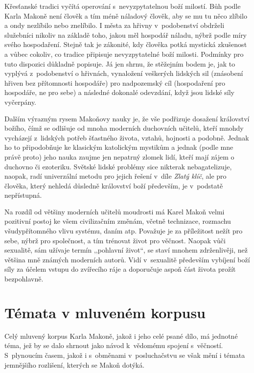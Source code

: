 Křesťanské tradici vyčítá operování s~nevyzpytatelnou boží milostí. Bůh podle
Karla Makoně není člověk a tím méně náladový člověk, aby se mu tu něco zlíbilo a
ondy nezlíbilo nebo znelíbilo. I města za hřivny v~podobenství obdrželi služebníci nikoliv na
základě toho, jakou měl hospodář náladu, nýbrž podle míry svého hospodaření.
Stejně tak je zákonité, kdy člověka potká mystická zkušenost a vůbec cokoliv, co
tradice připisuje nevyzpytatelné boží milosti. Podmínky pro tuto dispozici
důkladně popisuje. Já jen shrnu, že stěžejním bodem je, jak to vyplývá
z~podobenství o hřivnách, vynaložení veškerých lidských sil (znásobení hřiven
bez přítomnosti hospodáře) pro nadpozemský cíl (hospodaření pro hospodáře, ne
pro sebe) a následné dokonalé odevzdání, když jsou lidské síly vyčerpány.

Dalším výrazným rysem Makoňovy nauky je, že vše podřizuje dosažení království
božího, čímž se odlišuje od mnoha moderních duchovních učitelů, kteří mnohdy
vycházejí z~lidských potřeb šťastného života, vztahů, hojnosti a podobně. Jednak
ho to připodobňuje ke klasickým katolickým mystikům a jednak (podle mne právě
proto) jeho nauka zaujme jen nepatrný zlomek lidí, kteří mají zájem o duchovno
či ezoteriku. Světské lidské problémy sice nikterak nebagatelizuje, naopak, radí
univerzální metodu pro jejich řešení v~díle {\em Zlatý klíč}, ale pro člověka,
který nehledá důsledně království boží především, je v~podstatě nepřístupná.

Na rozdíl od většiny moderních učitelů moudrosti má Karel Makoň velmi pozitivní
postoj ke všem civilizačním změnám, včetně technizace, rozmachu
všudypřítomného vlivu systému, daním atp. Považuje je za příležitost nežít pro
sebe, nýbrž pro společnost, a tím trénovat život pro věčnost. Naopak vůči
sexualitě, sám užívaje termín ,,pohlavní život``, se staví mnohem zdrženlivěji,
než většina mně známých moderních autorů. Vidí v~sexualitě především vybíjení
boží síly za účelem vstupu do zvířecího ráje a doporučuje aspoň část života
prožít bezpohlavně.

\section{Témata v mluveném korpusu}

Celý mluvený korpus Karla Makoně, jakož i jeho celé psané dílo, má jednotné
téma, jež by se dalo shrnout jako návod k~vědomému spojení s~věčností.
S~plynoucím časem, jakož i s~obměnami v~posluchačstvu se však mění i témata
jemnějšího rozlišení, kterých se Makoň dotýká.

